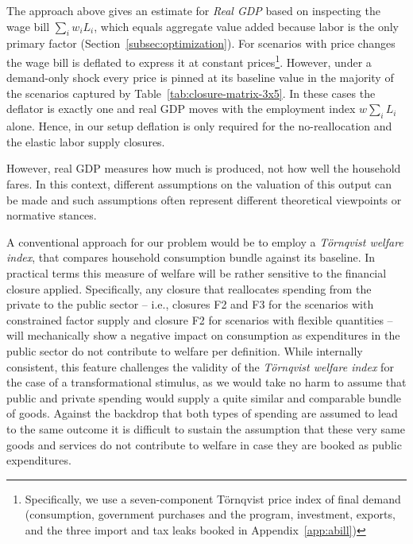 The approach above gives an estimate for \emph{Real GDP} based on inspecting
the wage bill $\sum_i w_i L_i$, which equals aggregate value added because labor is the only primary factor (Section~\ref{subsec:optimization}). For scenarios with price changes the wage bill is deflated to express it at constant prices\footnote{Specifically, we use a seven-component T\"ornqvist price index of final demand (consumption, government purchases and the program, investment, exports, and the three import and tax leaks booked in Appendix~\ref{app:abill})}. However, under a demand-only shock every price is pinned at its baseline value in the majority of the scenarios captured by Table~\ref{tab:closure-matrix-3x5}. In these cases the deflator is exactly one and real GDP moves with the employment index $w\sum_i L_i$ alone. Hence, in our setup deflation is only required for the no-reallocation and the elastic labor supply closures. 

However, real GDP measures how much is produced, not how well the household fares. In this context, different assumptions on the valuation of this output can be made and  such assumptions often represent different theoretical viewpoints or normative stances. 

A conventional approach for our problem would be to employ a \emph{T\"ornqvist welfare index}, that compares household consumption bundle against its baseline.  In practical terms this measure of welfare will be rather sensitive to the financial closure applied. Specifically, any closure that reallocates spending from the private to the public sector -- i.e., closures F2 and F3 for the scenarios with constrained factor supply and closure F2 for scenarios with flexible quantities -- will mechanically show a negative impact on consumption as expenditures in the public sector do not contribute to welfare per definition. While internally consistent, this feature challenges the validity of the \emph{T\"ornqvist welfare index} for the case of a transformational stimulus, as we would take no harm to assume that public and private spending would supply a quite similar and comparable bundle of goods. Against the backdrop that both types of spending are assumed to lead to the same outcome it is difficult to sustain the assumption that these very same goods and services do not contribute to welfare in case they are booked as public expenditures.

